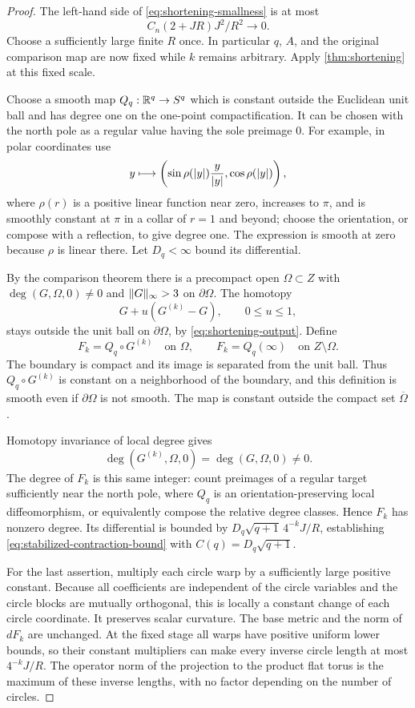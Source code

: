 \begin{proof}
The left-hand side of \eqref{eq:shortening-smallness} is at most
\[
 C_n(2+JR)J^2/R^2\longrightarrow0.
\]
Choose a sufficiently large finite $R$ once. In particular $q$, $A$, and the original comparison map are now fixed while $k$ remains arbitrary. Apply \cref{thm:shortening} at this fixed scale.

Choose a smooth map $Q_q:\mathbb R^q\to S^q$ which is constant outside the Euclidean unit ball and has degree one on the one-point compactification. It can be chosen with the north pole as a regular value having the sole preimage $0$. For example, in polar coordinates use
\[
 y\longmapsto
 \left(\sin\rho(\lvert y\rvert)\frac{y}{\lvert y\rvert},\cos\rho(\lvert y\rvert)\right),
\]
where $\rho(r)$ is a positive linear function near zero, increases to $\pi$, and is smoothly constant at $\pi$ in a collar of $r=1$ and beyond; choose the orientation, or compose with a reflection, to give degree one. The expression is smooth at zero because $\rho$ is linear there. Let $D_q<\infty$ bound its differential.

By the comparison theorem there is a precompact open $\Omega\subset Z$ with
$\deg(G,\Omega,0)\ne0$ and $\lVert G\rVert_{\infty}>3$ on $\partial\Omega$. The homotopy
\[
 G+u(G^{(k)}-G),\qquad 0\le u\le1,
\]
stays outside the unit ball on $\partial\Omega$, by
\eqref{eq:shortening-output}. Define
\[
 F_k=Q_q\circ G^{(k)}\quad\text{on }\Omega,
 \qquad F_k=Q_q(\infty)\quad\text{on }Z\setminus\Omega.
\]
The boundary is compact and its image is separated from the unit ball. Thus $Q_q\circ G^{(k)}$ is constant on a neighborhood of the boundary, and this definition is smooth even if $\partial\Omega$ is not smooth. The map is constant outside the compact set $\overline\Omega$.

Homotopy invariance of local degree gives
\[
 \deg(G^{(k)},\Omega,0)=\deg(G,\Omega,0)\ne0.
\]
The degree of $F_k$ is this same integer: count preimages of a regular target sufficiently near the north pole, where $Q_q$ is an orientation-preserving local diffeomorphism, or equivalently compose the relative degree classes. Hence $F_k$ has nonzero degree. Its differential is bounded by
$D_q\sqrt{q+1}\,4^{-k}J/R$, establishing
\eqref{eq:stabilized-contraction-bound} with $C(q)=D_q\sqrt{q+1}$.

For the last assertion, multiply each circle warp by a sufficiently large positive constant. Because all coefficients are independent of the circle variables and the circle blocks are mutually orthogonal, this is locally a constant change of each circle coordinate. It preserves scalar curvature. The base metric and the norm of $dF_k$ are unchanged. At the fixed stage all warps have positive uniform lower bounds, so their constant multipliers can make every inverse circle length at most $4^{-k}J/R$. The operator norm of the projection to the product flat torus is the maximum of these inverse lengths, with no factor depending on the number of circles.
\end{proof}

